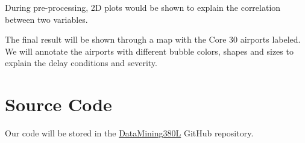 \documentclass{article}
\begin{document}
During pre-processing, 2D plots would be shown to explain the correlation between two variables.

The final result will be shown through a map with the Core 30 airports labeled. We will annotate the airports with different bubble colors, shapes and sizes to explain the delay conditions and severity.

\section{Source Code}
\label{sourcecode}
Our code will be stored in the \href{https://github.com/xiomarag/DataMining380L}{DataMining380L} GitHub repository.


\end{document}
